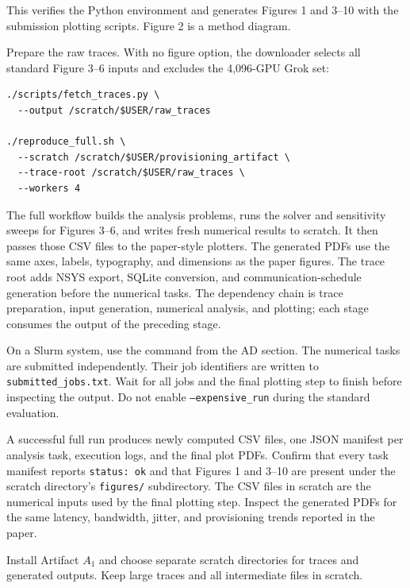 \documentclass[conference]{IEEEtran}
\begin{document}
This verifies the Python environment and generates Figures 1 and 3--10
with the submission plotting scripts. Figure 2 is a method diagram.

Prepare the raw traces. With no figure option, the downloader selects all
standard Figure 3--6 inputs and excludes the 4,096-GPU Grok set:

\begin{verbatim}
./scripts/fetch_traces.py \
  --output /scratch/$USER/raw_traces

./reproduce_full.sh \
  --scratch /scratch/$USER/provisioning_artifact \
  --trace-root /scratch/$USER/raw_traces \
  --workers 4
\end{verbatim}

The full workflow builds the analysis problems, runs the solver and
sensitivity sweeps for Figures 3--6, and writes fresh numerical results to
scratch. It then passes those CSV files to the paper-style plotters. The
generated PDFs use the same axes, labels, typography, and dimensions as the
paper figures. The trace root adds NSYS export, SQLite conversion, and
communication-schedule generation before the numerical tasks. The dependency
chain is trace preparation, input generation, numerical analysis, and
plotting; each stage consumes the output of the preceding stage.

On a Slurm system, use the command from the AD section. The numerical
tasks are submitted independently. Their job identifiers are written to
\texttt{submitted\_jobs.txt}. Wait for all jobs and the final plotting
step to finish before inspecting the output. Do not enable
\texttt{--expensive\_run} during the standard evaluation.

\artout

A successful full run produces newly computed CSV files, one JSON
manifest per analysis task, execution logs, and the final plot PDFs.
Confirm that every task manifest reports \texttt{status: ok} and that
Figures 1 and 3--10 are present under the scratch directory's
\texttt{figures/} subdirectory. The CSV files in scratch are the numerical
inputs used by the final plotting step.
Inspect the generated PDFs for the same latency, bandwidth, jitter, and
provisioning trends reported in the paper.

\arteval{2}

\artin

Install Artifact $A_1$ and choose separate scratch directories for traces
and generated outputs. Keep large traces and all intermediate files in
scratch.
\end{document}
